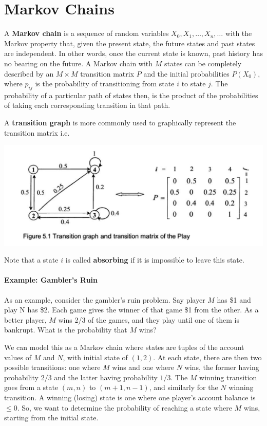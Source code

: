 \documentclass[10pt,a4paper]{article}
\begin{document}
\section{Markov Chains}
A \textbf{Markov chain} is a sequence of random variables $X_0,X_1,\dots,X_n,\dots$ with the Markov property that, given the present state, the future states and past states are independent. In other words, once the current state is known, past history has no bearing on the future. A Markov chain with $M$ states can be completely described by an $M \times M$ transition matrix $P$ and the initial probabilities $P(X_0)$, where $p_{ij}$ is the probability of transitioning from state $i$ to state $j$. The probability of a particular path of states then, is the product of the probabilities of taking each corresponding transition in that path.

A \textbf{transition graph} is more commonly used to graphically represent the transition matrix i.e.
\begin{center}
    \includegraphics[scale=0.5]{diagrams/markov_chain_graph.png}
\end{center}
Note that a state $i$ is called \textbf{absorbing} if it is impossible to leave this state.

\paragraph{Example: Gambler's Ruin} 
As an example, consider the gambler's ruin problem. Say player $M$ has \$1 and play N has \$2. Each game gives the winner of that game \$1 from the other. As a better player, $M$ wins 2/3 of the games, and they play until one of them is bankrupt. What is the probability that $M$ wins?

We can model this as a Markov chain where states are tuples of the account values of $M$ and $N$, with initial state of $(1,2)$. At each state, there are then two possible transitions: one where $M$ wins and one where $N$ wins, the former having probability $2/3$ and the latter having probability $1/3$. The $M$ winning transition goes from a state $(m,n)$ to $(m+1,n-1)$, and similarly for the $N$ winning transition. A winning (losing) state is one where one player's account balance is $\leq 0$. So, we want to determine the probability of reaching a state where $M$ wins, starting from the initial state.
\end{document}
